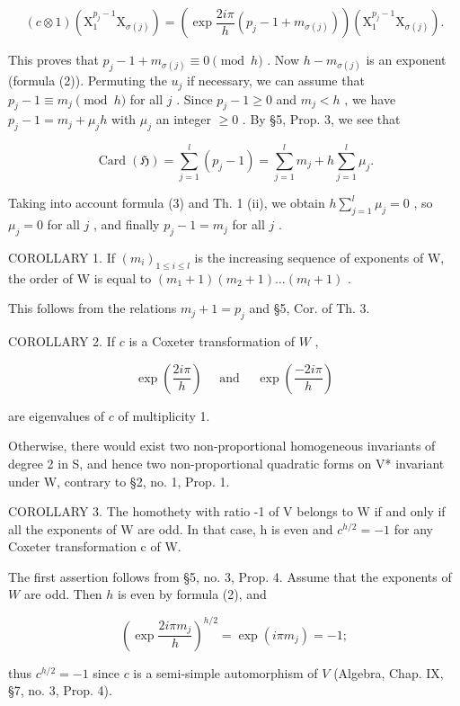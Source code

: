 \[
(c \otimes 1) (\mathrm{X} _ {1} ^ {p _ {j} - 1} \mathrm{X} _ {\sigma (j)}) = \left(\exp \frac {2 i \pi}{h} (p _ {j} - 1 + m _ {\sigma (j)})\right) (\mathrm{X} _ {1} ^ {p _ {j} - 1} \mathrm{X} _ {\sigma (j)}).
\]

This proves that \(p_j - 1 + m_{\sigma(j)} \equiv 0 \pmod{h}\) . Now \(h - m_{\sigma(j)}\) is an exponent (formula (2)). Permuting the \(u_j\) if necessary, we can assume that \(p_j - 1 \equiv m_j \pmod{h}\) for all \(j\) . Since \(p_j - 1 \geqslant 0\) and \(m_j < h\) , we have \(p_j - 1 = m_j + \mu_j h\) with \(\mu_j\) an integer \(\geqslant 0\) . By §5, Prop. 3, we see that

\[
\operatorname{Card} (\mathfrak {H}) = \sum_ {j = 1} ^ {l} (p _ {j} - 1) = \sum_ {j = 1} ^ {l} m _ {j} + h \sum_ {j = 1} ^ {l} \mu_ {j}.
\]

Taking into account formula (3) and Th. 1 (ii), we obtain \(h \sum_{j=1}^{l} \mu_j = 0\) , so \(\mu_j = 0\) for all \(j\) , and finally \(p_j - 1 = m_j\) for all \(j\) .

COROLLARY 1. If \((m_i)_{1\leqslant i\leqslant l}\) is the increasing sequence of exponents of W, the order of W is equal to \((m_1 + 1)(m_2 + 1)\ldots (m_l + 1)\) .

This follows from the relations \(m_j + 1 = p_j\) and §5, Cor. of Th. 3.

COROLLARY 2. If \(c\) is a Coxeter transformation of \(W\) ,

\[
\exp \left(\frac {2 i \pi}{h}\right) \quad \text { and } \quad \exp \left(\frac {- 2 i \pi}{h}\right)
\]

are eigenvalues of \(c\) of multiplicity 1.

Otherwise, there would exist two non-proportional homogeneous invariants of degree 2 in S, and hence two non-proportional quadratic forms on V* invariant under W, contrary to §2, no. 1, Prop. 1.

COROLLARY 3. The homothety with ratio -1 of V belongs to W if and only if all the exponents of W are odd. In that case, h is even and \(c^{h/2} = -1\) for any Coxeter transformation c of W.

The first assertion follows from §5, no. 3, Prop. 4. Assume that the exponents of \(W\) are odd. Then \(h\) is even by formula (2), and

\[
\left(\exp \frac {2 i \pi m _ {j}}{h}\right) ^ {h / 2} = \exp (i \pi m _ {j}) = - 1;
\]

thus \(c^{h/2} = -1\) since \(c\) is a semi-simple automorphism of \(V\) (Algebra, Chap. IX, §7, no. 3, Prop. 4).

